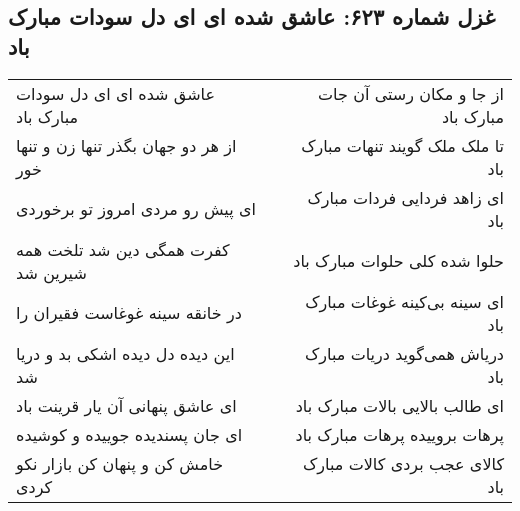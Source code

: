 \begin{center}
\section*{غزل شماره ۶۲۳: عاشق شده ای ای دل سودات مبارک باد}
\label{sec:0623}
\begin{longtable}{l p{0.5cm} r}
عاشق شده ای ای دل سودات مبارک باد
&&
از جا و مکان رستی آن جات مبارک باد
\\
از هر دو جهان بگذر تنها زن و تنها خور
&&
تا ملک ملک گویند تنهات مبارک باد
\\
ای پیش رو مردی امروز تو برخوردی
&&
ای زاهد فردایی فردات مبارک باد
\\
کفرت همگی دین شد تلخت همه شیرین شد
&&
حلوا شده کلی حلوات مبارک باد
\\
در خانقه سینه غوغاست فقیران را
&&
ای سینه بی‌کینه غوغات مبارک باد
\\
این دیده دل دیده اشکی بد و دریا شد
&&
دریاش همی‌گوید دریات مبارک باد
\\
ای عاشق پنهانی آن یار قرینت باد
&&
ای طالب بالایی بالات مبارک باد
\\
ای جان پسندیده جوییده و کوشیده
&&
پرهات بروییده پرهات مبارک باد
\\
خامش کن و پنهان کن بازار نکو کردی
&&
کالای عجب بردی کالات مبارک باد
\\
\end{longtable}
\end{center}

